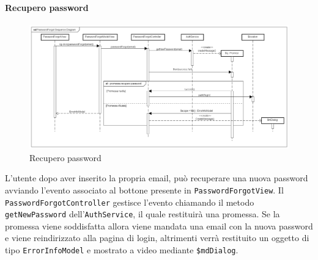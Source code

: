 \paragraph{Recupero password}

\label{Recupero password}

\begin{figure}[ht]
	\centering
	\includegraphics[scale=0.4,keepaspectratio]{UML/DiagrammiDiSequenza/Front-end/PasswordForgot.png}
	\caption{Recupero password}
\end{figure} \FloatBarrier

L'utente dopo aver inserito la propria email, può recuperare una nuova password avviando l'evento associato al bottone presente in \texttt{PasswordForgotView}. Il \texttt{PasswordForgotController} gestisce l'evento chiamando il metodo \texttt{getNewPassword} dell'\texttt{AuthService}, il quale restituirà una promessa. Se la promessa viene soddisfatta allora viene mandata una email con la nuova password e viene reindirizzato alla pagina di login, altrimenti verrà restituito un oggetto di tipo \texttt{ErrorInfoModel} e mostrato a video mediante \texttt{\$mdDialog}. 